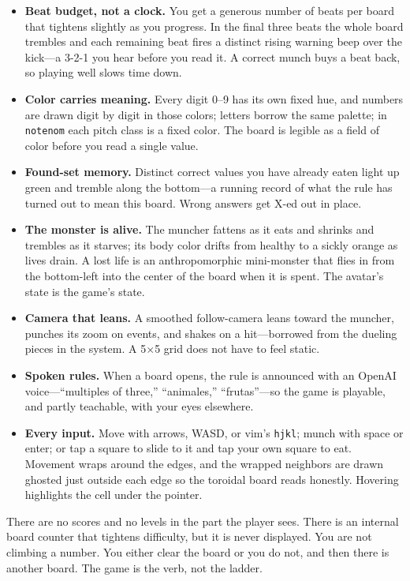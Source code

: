 \documentclass[10pt,letterpaper,twocolumn]{article}
\begin{document}
\begin{itemize}
  \item \textbf{Beat budget, not a clock.} You get a generous number of beats per board that tightens slightly as you progress. In the final three beats the whole board trembles and each remaining beat fires a distinct rising warning beep over the kick---a 3-2-1 you hear before you read it. A correct munch buys a beat back, so playing well slows time down.
  \item \textbf{Color carries meaning.} Every digit 0--9 has its own fixed hue, and numbers are drawn digit by digit in those colors; letters borrow the same palette; in \texttt{notenom} each pitch class is a fixed color. The board is legible as a field of color before you read a single value.
  \item \textbf{Found-set memory.} Distinct correct values you have already eaten light up green and tremble along the bottom---a running record of what the rule has turned out to mean this board. Wrong answers get X-ed out in place.
  \item \textbf{The monster is alive.} The muncher fattens as it eats and shrinks and trembles as it starves; its body color drifts from healthy to a sickly orange as lives drain. A lost life is an anthropomorphic mini-monster that flies in from the bottom-left into the center of the board when it is spent. The avatar's state is the game's state.
  \item \textbf{Camera that leans.} A smoothed follow-camera leans toward the muncher, punches its zoom on events, and shakes on a hit---borrowed from the dueling pieces in the system. A 5$\times$5 grid does not have to feel static.
  \item \textbf{Spoken rules.} When a board opens, the rule is announced with an OpenAI voice---``multiples of three,'' ``animales,'' ``frutas''---so the game is playable, and partly teachable, with your eyes elsewhere.
  \item \textbf{Every input.} Move with arrows, WASD, or vim's \texttt{hjkl}; munch with space or enter; or tap a square to slide to it and tap your own square to eat. Movement wraps around the edges, and the wrapped neighbors are drawn ghosted just outside each edge so the toroidal board reads honestly. Hovering highlights the cell under the pointer.
\end{itemize}

There are no scores and no levels in the part the player sees. There is an internal board counter that tightens difficulty, but it is never displayed. You are not climbing a number. You either clear the board or you do not, and then there is another board. The game is the verb, not the ladder.
\end{document}

